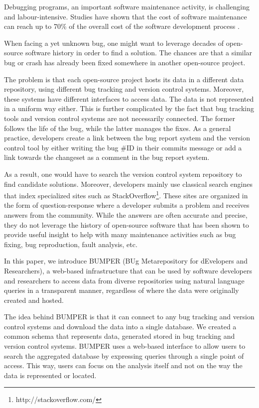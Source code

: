 \documentclass[conference]{IEEEtran}
\begin{document}
Debugging programs, an important software maintenance activity, is challenging  and labour-intensive. Studies have shown that the cost of software maintenance can reach up to 70\% of the overall cost of the software development process \cite{Pressman2005}.

When facing a yet unknown bug, one might want to leverage decades of open-source software history in order to find a solution. The chances are that a similar bug or crash has already been fixed somewhere in another open-source project.

The problem is that each open-source project hosts its data in a different data repository, using different bug tracking and version control systems. Moreover, these systems have different interfaces to access data.
The data is not represented in a uniform way either.
This is further complicated by the fact that bug tracking tools and version control systems are not necessarily connected.
The former follows the life of the bug, while the latter manages the fixes.
As a general practice, developers create a link between the bug report system and the version control tool by either writing the bug \#ID in their commits message or add a link towards the changeset as a comment in the bug report system.

As a result, one would have to search the version control system repository to find candidate solutions.
 Moreover, developers mainly use classical search engines that index specialized sites such as StackOverflow\footnote{http://stackoverflow.com/}. These sites are organized in the form of question-response where a developer submits a problem and receives answers from the community. While the answers are often accurate and precise, they do not leverage the history of open-source software that has been shown to provide useful insight to help with many maintenance activities such as bug fixing\cite{Saha2014}, bug reproduction\cite{Chen2013a}, fault analysis\cite{Nessa2008}, etc.

In this paper, we introduce BUMPER (BUg Metarepository for dEvelopers and Researchers), a web-based infrastructure that can be used by software developers and researchers to access data from diverse repositories using natural language queries in a transparent manner, regardless of where the data were originally created and hosted.

The idea behind BUMPER is that it can connect to any bug tracking and version control systems and download the data into a single database. We created a common schema that represents data, generated stored in bug tracking and version control systems.
BUMPER uses a web-based interface to allow users to search the aggregated database by expressing queries through a single point of access.
This way, users can focus on the analysis itself and not on the way the data is represented or located.
\end{document}
